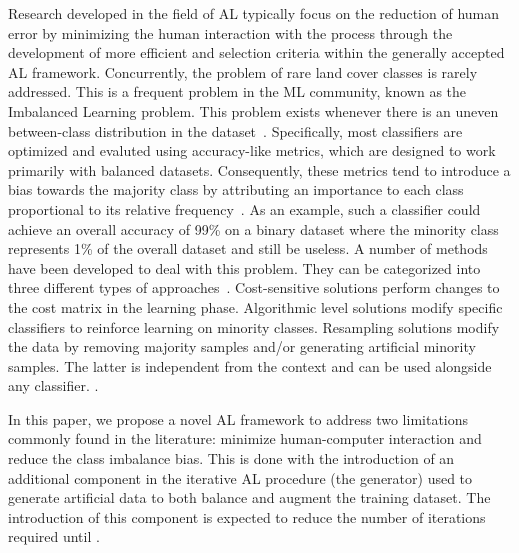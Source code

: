 \documentclass[remotesensing,article,submit,moreauthors,pdftex]{Definitions/mdpi}
\begin{document}
Research developed in the field of AL typically focus on the reduction of
human error by minimizing the human interaction with the process through the
development of more efficient  and selection
criteria within the generally accepted AL framework. Concurrently, the problem
of rare land cover classes is rarely addressed. This is a frequent problem in
the ML community, known as the Imbalanced Learning problem. This problem
exists whenever there is an uneven between-class distribution in the
dataset~\cite{Chawla2004}.  Specifically, most classifiers are optimized and
evaluted using accuracy-like metrics, which are designed to work primarily
with balanced datasets.  Consequently, these metrics tend to introduce a bias
towards the majority class by attributing an importance to each class
proportional to its relative frequency~\cite{Maxwell2018}. As an example, such
a classifier could achieve an overall accuracy of 99\% on a binary dataset
where the minority class represents 1\% of the overall dataset and still be
useless. A number of methods have been developed to deal with this problem.
They can be categorized into three different types of
approaches~\cite{Fernandez2013,Kaur2019}.  Cost-sensitive solutions perform
changes to the cost matrix in the learning phase. Algorithmic level solutions
modify specific classifiers to reinforce learning on minority classes.
Resampling solutions modify the  data by removing
majority samples and/or generating artificial minority samples. The latter is
independent from the context and can be used alongside any classifier.
.

In this paper, we propose a novel AL framework to address two limitations
commonly found in the literature: minimize human-computer interaction and
reduce the class imbalance bias. This is done with the introduction of an
additional component in the iterative AL procedure (the generator)  used to generate artificial data to both balance and augment the training
dataset. The introduction of this component is expected to reduce the number
of iterations required until .
\end{document}
